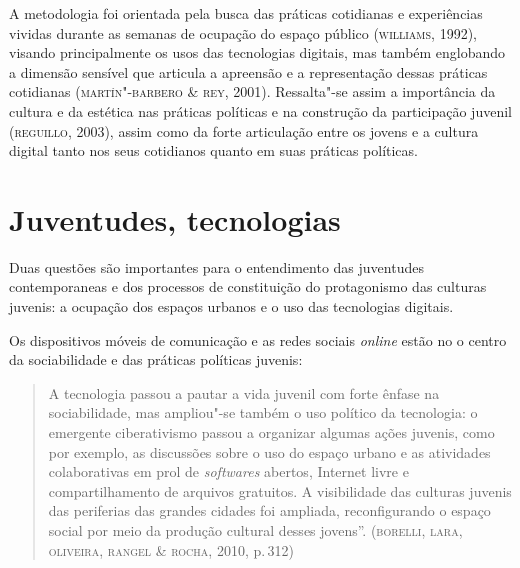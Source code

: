 A metodologia foi orientada pela busca das práticas cotidianas e
experiências vividas durante as semanas de ocupação do espaço público
(\textsc{williams}, 1992), visando principalmente os usos das tecnologias
digitais, mas também englobando a dimensão sensível que articula a
apreensão e a representação dessas práticas cotidianas (\textsc{martín"-barbero \&
rey}, 2001). Ressalta"-se assim a importância da cultura e da estética nas
práticas políticas e na construção da participação juvenil (\textsc{reguillo},
2003), assim como da forte articulação entre os jovens e a cultura
digital tanto nos seus cotidianos quanto em suas práticas políticas.

\section{Juventudes, tecnologias}

Duas questões são importantes para o entendimento das juventudes
contemporaneas e dos processos de constituição do protagonismo das
culturas juvenis: a ocupação dos espaços urbanos e o uso das tecnologias
digitais.

Os dispositivos móveis de comunicação e as redes sociais \textit{online} estão no
o centro da sociabilidade e das práticas políticas juvenis:

\begin{quote}
A tecnologia passou a pautar a vida juvenil com forte ênfase na
sociabilidade, mas ampliou"-se também o uso político da tecnologia: o
emergente ciberativismo passou a organizar algumas ações juvenis, como
por exemplo, as discussões sobre o uso do espaço urbano e as atividades
colaborativas em prol de \textit{softwares} abertos, Internet livre e
compartilhamento de arquivos gratuitos. A visibilidade das culturas
juvenis das periferias das grandes cidades foi ampliada, reconfigurando
o espaço social por meio da produção cultural desses jovens''. (\textsc{borelli,
lara, oliveira, rangel \& rocha}, 2010, p.\,312)
\end{quote}

